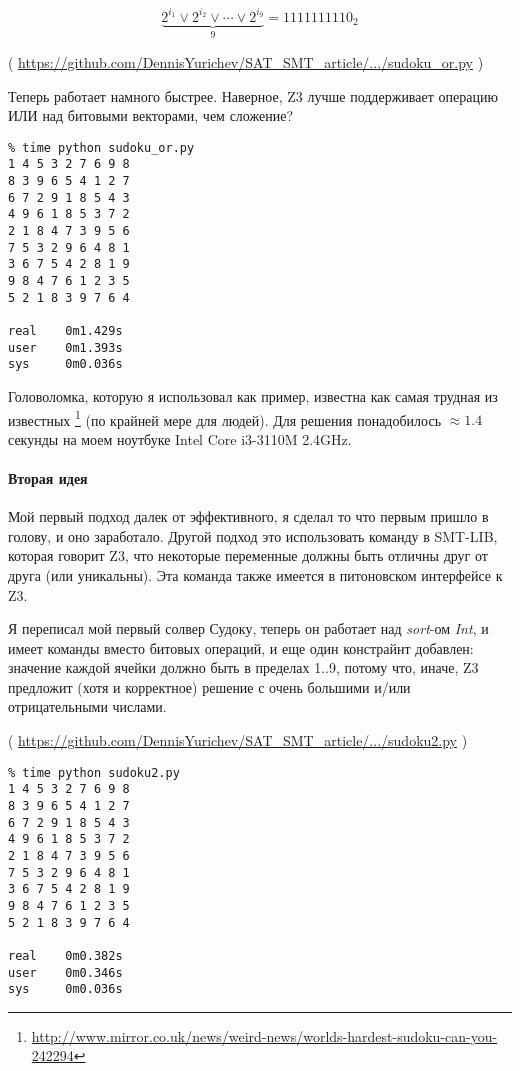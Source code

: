 \begin{equation}
\underbrace{2^{i_1} \vee 2^{i_2} \vee \cdots \vee 2^{i_9}}_9 = 1111111110_2
\end{equation}


( \url{https://github.com/DennisYurichev/SAT_SMT_article/.../sudoku_or.py} )

Теперь работает намного быстрее. Наверное, Z3 лучше поддерживает операцию ИЛИ над битовыми векторами, чем сложение?

\begin{lstlisting}
% time python sudoku_or.py
1 4 5 3 2 7 6 9 8
8 3 9 6 5 4 1 2 7
6 7 2 9 1 8 5 4 3
4 9 6 1 8 5 3 7 2
2 1 8 4 7 3 9 5 6
7 5 3 2 9 6 4 8 1
3 6 7 5 4 2 8 1 9
9 8 4 7 6 1 2 3 5
5 2 1 8 3 9 7 6 4

real    0m1.429s
user    0m1.393s
sys     0m0.036s
\end{lstlisting}

Головоломка, которую я использовал как пример, известна как самая трудная из известных
\footnote{\url{http://www.mirror.co.uk/news/weird-news/worlds-hardest-sudoku-can-you-242294}} (по крайней мере для людей).
Для решения понадобилось $\approx 1.4$ секунды на моем ноутбуке Intel Core i3-3110M 2.4GHz.

\paragraph{Вторая идея}

Мой первый подход далек от эффективного, я сделал то что первым пришло в голову, и оно заработало.
Другой подход это использовать команду  в SMT-LIB, которая говорит Z3, что некоторые переменные
должны быть отличны друг от друга (или уникальны).
Эта команда также имеется в питоновском интерфейсе к Z3.

Я переписал мой первый солвер Судоку, теперь он работает над \textit{sort}-ом 
\textit{Int}, и имеет команды  вместо битовых операций,
и еще один констрайнт добавлен: значение каждой ячейки должно быть в пределах 1..9, потому что, иначе, Z3 предложит
(хотя и корректное) решение с очень большими и/или отрицательными числами.


( \url{https://github.com/DennisYurichev/SAT_SMT_article/.../sudoku2.py} )

\begin{lstlisting}
% time python sudoku2.py
1 4 5 3 2 7 6 9 8
8 3 9 6 5 4 1 2 7
6 7 2 9 1 8 5 4 3
4 9 6 1 8 5 3 7 2
2 1 8 4 7 3 9 5 6
7 5 3 2 9 6 4 8 1
3 6 7 5 4 2 8 1 9
9 8 4 7 6 1 2 3 5
5 2 1 8 3 9 7 6 4

real    0m0.382s
user    0m0.346s
sys     0m0.036s
\end{lstlisting}

